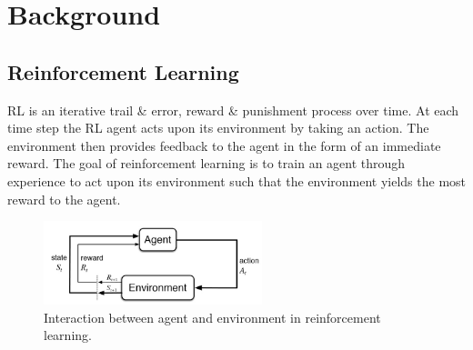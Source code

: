 \documentclass[10pt,journal,compsoc]{IEEEtran}
\begin{document}
%






\section{Background}
\subsection{Reinforcement Learning}
RL is an iterative trail \& error, reward \& punishment process over time. At each time step the RL agent acts upon its environment by taking an action. The environment then provides feedback to the agent in the form of an immediate reward. The goal of reinforcement learning is to train an agent through experience to act upon its environment such that the environment yields the most reward to the agent.
\begin{figure}[!h]
\centering
\includegraphics[width=2.5in]{rl_process}
\caption{Interaction between agent and environment in reinforcement learning.}
\label{rl_process_loop}
\end{figure}
\end{document}
